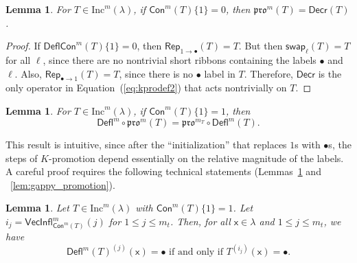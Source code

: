 \documentclass[12pt]{amsart}
\newcommand{\x}{\ensuremath{\mathsf{x}}}
\newtheorem{lemma}[theorem]{Lemma}
\theoremstyle{definition}
\theoremstyle{remark}
\numberwithin{equation}{section}
\newcommand{\inc}{\ensuremath{\mathrm{Inc}}}
\newcommand{\pro}{\mathfrak{pro}}
\newcommand{\swap}{\ensuremath{\mathsf{swap}}}
\newcommand{\decr}{\ensuremath{\mathsf{Decr}}}
\newcommand{\rep}{\ensuremath{\mathsf{Rep}}}
\newcommand{\deflate}{\ensuremath{\mathsf{Defl}}}
\newcommand{\inflate}{\ensuremath{\mathsf{VecInfl}}}
\newcommand{\content}{\ensuremath{\mathsf{Con}}}
\newcommand{\compress}{\ensuremath{\mathsf{DeflCon}}}
\begin{document}
\begin{lemma}\label{lem:no_ones}
For $T \in \inc^m(\lambda)$, if $\content^m(T)\lbrace 1 \rbrace = 0$, then $\pro^m(T) = \decr(T)$. 
\end{lemma} 
\begin{proof}
If $\compress^m(T)\lbrace 1 \rbrace = 0$, then $\rep_{1 \rightarrow \bullet}(T) = T$. But then $\swap_\ell(T) = T$ for all $\ell$, since there are no nontrivial short ribbons containing the labels $\bullet$ and $\ell$. Also, $\rep_{\bullet \rightarrow 1}(T) = T$, since there is no $\bullet$ label in $T$. Therefore, $\decr$ is the only operator in Equation~(\ref{eq:kprodef2}) that acts nontrivially on $T$. 
\end{proof}
\begin{lemma}\label{lem:deflation_commutation}
For $T \in \inc^m(\lambda)$, if $\content^m(T) \lbrace 1 \rbrace = 1$, then
\begin{equation}\label{eq:deflation_commutation}
\deflate^m \circ \pro^m(T) = \pro^{m_T} \circ \deflate^m(T).
\end{equation}
\end{lemma} This result is intuitive, since after the ``initialization'' that replaces $1$s with $\bullet$s, the steps of $K$-promotion depend essentially on the relative magnitude of the labels. A careful proof requires the following technical statements (Lemmas~\ref{lem:bullet_placement} and ~\ref{lem:gappy_promotion}). 
\begin{lemma} \label{lem:bullet_placement}
Let $T \in \inc^m(\lambda)$ with $\content^m(T) \lbrace 1 \rbrace = 1$. Let $i_j = \inflate^m_{\content^m(T)}(j)$ for $1 \leq j \leq m_t$. Then, for all $\x \in \lambda$ and $1 \leq j \leq m_t$, we have
 \begin{equation}\label{eq:gappy_promotion2}
\deflate^m(T)^{(j)}(\x) = \bullet \text{ if and only if } T^{(i_j)}(\x) = \bullet.
\end{equation}
\end{lemma}
\end{document}
